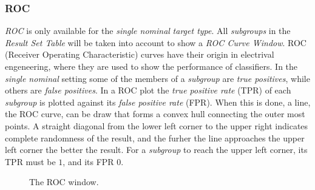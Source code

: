 \documentclass{article}
\begin{document}
\subsubsection{ROC}
\label{result-window:roc}
\emph{ROC} is only available for the \emph{single nominal} \emph{target type}.
All \emph{subgroups} in the \emph{Result Set Table} will be taken into account to show a \emph{ROC Curve Window}.
ROC (Receiver Operating Characteristic) curves have their origin in electrival engeneering, where they are used to show the performance of classifiers.
In the \emph{single nominal} setting some of the members of a \emph{subgroup} are \emph{true positives}, while others are \emph{false positives}.
In a ROC plot the \emph{true positive rate} (TPR) of each \emph{subgroup} is plotted against its \emph{false positive rate} (FPR).
When this is done, a line, the ROC curve, can be draw that forms a convex hull connecting the outer most points.
A straight diagonal from the lower left corner to the upper right indicates complete randomness of the result, and the furher the line approaches the upper left corner the better the result.
For a \emph{subgroup} to reach the upper left corner, its TPR must be $1$, and its FPR $0$.

\begin{figure}
\begin{center}
\centering
{}
\caption{The ROC window.}
\end{center}
\label{fig:rocwindow}
\end{figure}
\end{document}
